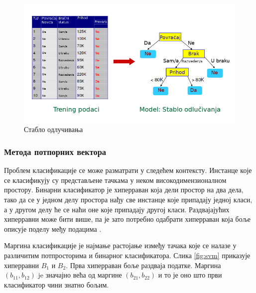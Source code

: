 \documentclass[a4paper]{article}
\begin{document}
{\begin{figure}[h!]
\begin{center}
\includegraphics[scale=0.4]{./slike/decision_tree.png}
\end{center}
\caption{Стабло одлучивања}
\label{fig:stablo}
\end{figure}


\subsubsection*{Метода потпорних вектора}
Проблем класификације се може разматрати у следећем контексту. Инстанце које се класификују су представљене тачкама у неком високодимензионалном простору. Бинарни класификатор је хиперраван која дели простор на два дела, тако да се у једном делу простора нађу све инстанце које припадају једној класи, а у другом делу ће се наћи оне које припадају другој класи. Раздвајајућих хиперравни може бити више, па је зато потребно одабрати хиперраван која боље описује поделу међу подацима \cite{svm-intro}.


Маргина класификације је најмање растојање између тачака које се налазе у различитим потпросторима и бинарног класификатора. Слика \ref{fig:svm} приказује хиперравни $B_1$ и $B_2$. Прва хиперраван боље раздваја податке. Маргина $(b_11, b_12)$ je значајно већа од маргине $(b_{21}, b_{22})$ и то је оно што први класификатор чини знатно бољим.

}
\end{document}

